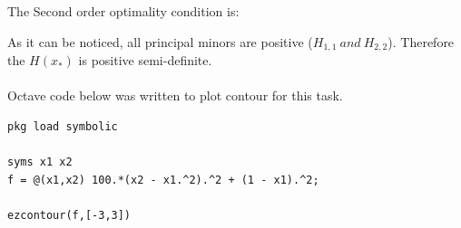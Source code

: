 \documentclass[eng,openany]{mgr}
\begin{document}
The Second order optimality condition is:\\
As it can be noticed, all principal minors are positive ($H_{1,1}\ and\ H_{2,2}$). Therefore the $H(x_*)$ is positive semi-definite.\\
\\
Octave code below was written to plot contour for this task.
\begin{lstlisting}
pkg load symbolic

syms x1 x2
f = @(x1,x2) 100.*(x2 - x1.^2).^2 + (1 - x1).^2;

ezcontour(f,[-3,3])
\end{lstlisting}
\end{document}
